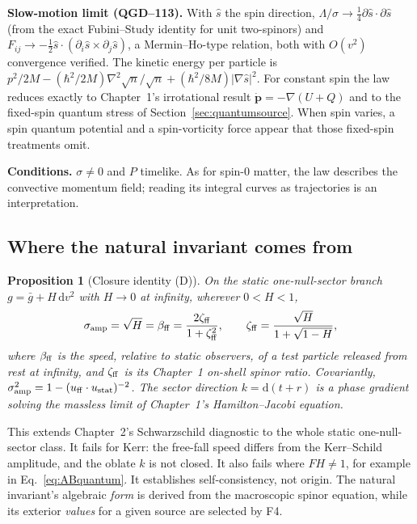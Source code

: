 \documentclass[11pt,a4paper]{article}
\newtheorem{proposition}[theorem]{Proposition}
\begin{document}
\noindent\textbf{Slow-motion limit (QGD--113).} With $\hat s$ the spin direction,
$\Lambda/\sigma\to\frac14\partial\hat s\cdot\partial\hat s$ (from the exact Fubini--Study identity
for unit two-spinors) and $F_{ij}\to-\frac12\hat s\cdot(\partial_i\hat s\times\partial_j\hat s)$, a
Mermin--Ho-type relation, both with $O(v^2)$ convergence verified. The kinetic
energy per particle is
$p^2/2M-(\hbar^2/2M)\nabla^2\sqrt n/\sqrt n+(\hbar^2/8M)|\nabla\hat s|^2$. For constant spin
the law reduces exactly to Chapter~1's irrotational result
$\dot{\bm p}=-\nabla(U+Q)$ and to the fixed-spin quantum stress of
Section~\ref{sec:quantumsource}. When spin varies, a spin quantum potential and a
spin-vorticity force appear that those fixed-spin treatments omit.

\noindent\textbf{Conditions.} $\sigma\neq0$ and $P$ timelike. As for spin-0 matter, the
law describes the convective momentum field; reading its integral curves as
trajectories is an interpretation.

\subsection{Where the natural invariant comes from}
\begin{proposition}[Closure identity (D)]\label{prop:closure}
On the static one-null-sector branch $g=\bar g+H\,\mathrm dv^2$ with $H\to0$ at
infinity, wherever $0<H<1$,
\begin{equation}\label{eq:closure}
\sigma_{\rm amp}=\sqrt H=\beta_{\rm ff}=\frac{2\zeta_{\rm ff}}{1+\zeta_{\rm ff}^2},\qquad
\zeta_{\rm ff}=\frac{\sqrt H}{1+\sqrt{1-H}},
\end{equation}
where $\beta_{\rm ff}$ is the speed, relative to static observers, of a test
particle released from rest at infinity, and $\zeta_{\rm ff}$ is its Chapter~1
on-shell spinor ratio. Covariantly, $\sigma_{\rm amp}^2=1-(u_{\rm ff}\cdot u_{\rm stat})^{-2}$.
The sector direction $k=\mathrm d(t+r)$ is a phase gradient solving the massless
limit of Chapter~1's Hamilton--Jacobi equation.
\end{proposition}
\noindent This extends Chapter~2's Schwarzschild diagnostic to the whole static
one-null-sector class. It fails for Kerr: the free-fall speed differs from the
Kerr--Schild amplitude, and the oblate $k$ is not closed. It also fails where
$FH\neq1$, for example in Eq.~\eqref{eq:ABquantum}. It establishes
self-consistency, not origin. The natural invariant's algebraic \emph{form} is
derived from the macroscopic spinor equation, while its exterior \emph{values}
for a given source are selected by F4.
\end{document}
